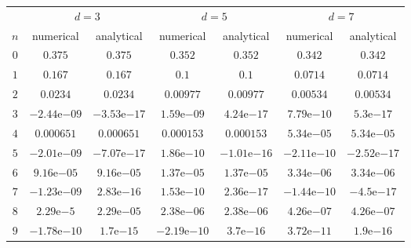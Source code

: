 \begin{tabular}{@{}ccccccc@{}}
\toprule
& 
\multicolumn{2}{c}{$d = 3$} &
\multicolumn{2}{c}{$d = 5$} &
\multicolumn{2}{c}{$d = 7$} \\
\cmidrule(lr){2-3} \cmidrule(lr){4-5} \cmidrule(lr){6-7}
$n$ &
numerical &
analytical &
numerical &
analytical &
numerical &
analytical \\
\midrule
$0$ &
$0.375$ &
$0.375$ &
$0.352$ &
$0.352$ &
$0.342$ &
$0.342$ \\
$1$ &
$0.167$ &
$0.167$ &
$0.1$ &
$0.1$ &
$0.0714$ &
$0.0714$ \\
$2$ &
$0.0234$ &
$0.0234$ &
$0.00977$ &
$0.00977$ &
$0.00534$ &
$0.00534$ \\
$3$ &
$-2.44\mathrm{e}{-09}$ &
$-3.53\mathrm{e}{-17}$ &
$1.59\mathrm{e}{-09}$ &
$4.24\mathrm{e}{-17}$ &
$7.79\mathrm{e}{-10}$ &
$5.3\mathrm{e}{-17}$ \\
$4$ &
$0.000651$ &
$0.000651$ &
$0.000153$ &
$0.000153$ &
$5.34\mathrm{e}{-05}$ &
$5.34\mathrm{e}{-05}$ \\
$5$ &
$-2.01\mathrm{e}{-09}$ &
$-7.07\mathrm{e}{-17}$ &
$1.86\mathrm{e}{-10}$ &
$-1.01\mathrm{e}{-16}$ &
$-2.11\mathrm{e}{-10}$ &
$-2.52\mathrm{e}{-17}$ \\
$6$ &
$9.16\mathrm{e}{-05}$ &
$9.16\mathrm{e}{-05}$ &
$1.37\mathrm{e}{-05}$ &
$1.37\mathrm{e}{-05}$ &
$3.34\mathrm{e}{-06}$ &
$3.34\mathrm{e}{-06}$ \\
$7$ &
$-1.23\mathrm{e}{-09}$ &
$2.83\mathrm{e}{-16}$ &
$1.53\mathrm{e}{-10}$ &
$2.36\mathrm{e}{-17}$ &
$-1.44\mathrm{e}{-10}$ &
$-4.5\mathrm{e}{-17}$ \\
$8$ &
$2.29\mathrm{e}{-5}$ &
$2.29\mathrm{e}{-05}$ &
$2.38\mathrm{e}{-06}$ &
$2.38\mathrm{e}{-06}$ &
$4.26\mathrm{e}{-07}$ &
$4.26\mathrm{e}{-07}$ \\
$9$ &
$-1.78\mathrm{e}{-10}$ &
$1.7\mathrm{e}{-15}$ &
$-2.19\mathrm{e}{-10}$ &
$3.7\mathrm{e}{-16}$ &
$3.72\mathrm{e}{-11}$ &
$1.9\mathrm{e}{-16}$ \\
\bottomrule

\end{tabular}